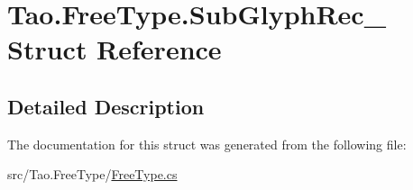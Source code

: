 \hypertarget{struct_tao_1_1_free_type_1_1_sub_glyph_rec__}{
\section{Tao.FreeType.SubGlyphRec\_\- Struct Reference}
\label{struct_tao_1_1_free_type_1_1_sub_glyph_rec__}
}


\subsection{Detailed Description}


The documentation for this struct was generated from the following file:\begin{DoxyCompactItemize}
\item 
src/Tao.FreeType/\hyperlink{_free_type_8cs}{FreeType.cs}\end{DoxyCompactItemize}
